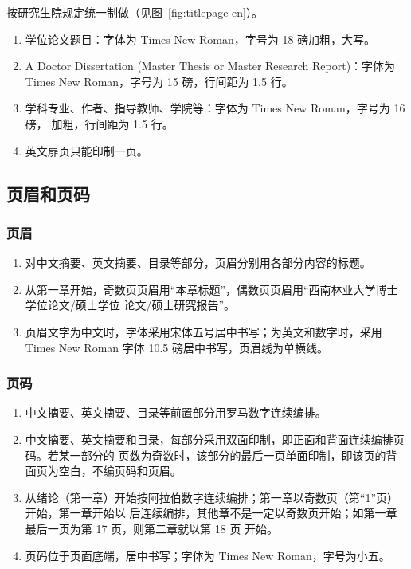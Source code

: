 按研究生院规定统一制做（见图~\ref{fig:titlepage-en}）。

\begin{enumerate}
\item 学位论文题目：字体为 Times New Roman，字号为 18 磅加粗，大写。
\item A Doctor Dissertation (Master Thesis or Master Research Report)：字体为Times New Roman，字号为 15 磅，行间距为 1.5 行。
\item 学科专业、作者、指导教师、学院等：字体为 Times New Roman，字号为 16 磅， 加粗，行间距为 1.5 行。
\item 英文扉页只能印制一页。
\end{enumerate}

\subsection{页眉和页码}

\subsubsection{页眉}

\begin{enumerate}
\item 对中文摘要、英文摘要、目录等部分，页眉分别用各部分内容的标题。
\item 从第一章开始，奇数页页眉用“本章标题”，偶数页页眉用“西南林业大学博士学位论文/硕士学位
  论文/硕士研究报告”。
\item 页眉文字为中文时，字体采用宋体五号居中书写；为英文和数字时，采用 Times New
  Roman 字体 10.5 磅居中书写，页眉线为单横线。
\end{enumerate}

\subsubsection{页码}

\begin{enumerate}
\item 中文摘要、英文摘要、目录等前置部分用罗马数字连续编排。
\item 中文摘要、英文摘要和目录，每部分采用双面印制，即正面和背面连续编排页码。若某一部分的
  页数为奇数时，该部分的最后一页单面印制，即该页的背面页为空白，不编页码和页眉。
\item 从绪论（第一章）开始按阿拉伯数字连续编排；第一章以奇数页（第“1”页）开始，第一章开始以
  后连续编排，其他章不是一定以奇数页开始；如第一章最后一页为第 17 页，则第二章就以第 18 页
  开始。
\item 页码位于页面底端，居中书写；字体为 Times New Roman，字号为小五。
\end{enumerate}

